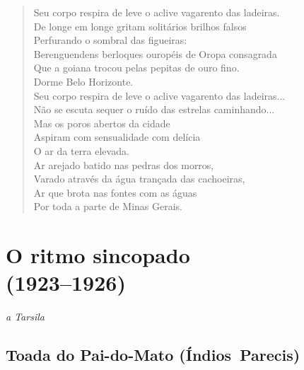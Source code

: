 \begin{verse}
Seu corpo respira de leve o aclive vagarento das ladeiras.\\
De longe em longe gritam solitários brilhos falsos\\
Perfurando o sombral das figueiras:\\
Berenguendens berloques ouropéis de Oropa consagrada\\
Que a goiana trocou pelas pepitas de ouro fino.\\
Dorme Belo Horizonte.\\
Seu corpo respira de leve o aclive vagarento das ladeiras...\\
Não se escuta sequer o ruído das estrelas caminhando...\\
Mas os poros abertos da cidade\\
Aspiram com sensualidade com delícia\\
O ar da terra elevada.\\
Ar arejado batido nas pedras dos morros,\\
Varado através da água trançada das cachoeiras,\\
Ar que brota nas fontes com as águas\\
Por toda a parte de Minas Gerais.
\end{verse}

\chapter[\textsc{o ritmo sincopado}\\Toada do Pai-do-Mato]{O ritmo sincopado\\(1923--1926)}


\begin{flushright}
\emph{a Tarsila}
\end{flushright}

\section{Toada do Pai-do-Mato (Índios~Parecis)}


